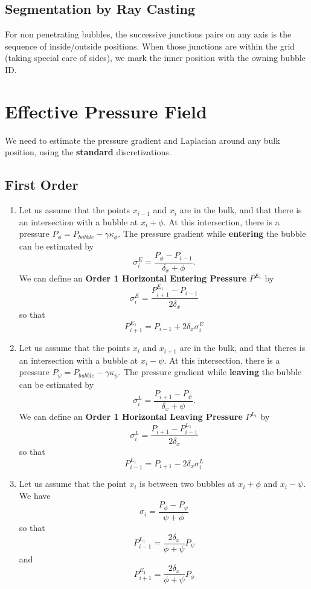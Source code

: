 \documentclass[aps]{revtex4}
\begin{document}
\subsection{Segmentation by Ray Casting}
For non penetrating bubbles, the successive junctions pairs on any axis is the sequence of inside/outside positions.
When those junctions are within the grid (taking special care of sides), we mark the inner position with the owning bubble ID.

\section{Effective Pressure Field}
We need to estimate the pressure gradient and Laplacian around any bulk position,
using the \textbf{standard} discretizations.

\subsection{First Order}
\begin{enumerate}
\item
Let us assume that the points $x_{i-1}$ and $x_i$ are in the bulk, and that there is
an intersection with a bubble at $x_i+\phi$. 
At this intersection, there is a pressure $P_\phi = P_{bubble} - \gamma \kappa_\phi$.
The pressure gradient while \textbf{entering} the bubble can be estimated by
$$
	\sigma^E_i = \dfrac{P_\phi - P_{i-1}}{\delta_x+\phi}.
$$
We can define an \textbf{Order 1 Horizontal Entering Pressure} $P^{E_1}$ by
$$
	\sigma^E_i = \dfrac{P^{E_1}_{i+1}-P_{i-1}}{2\delta_x} 
$$
so that
$$
	P^{E_1}_{i+1} = P_{i-1} + 2\delta_x\sigma^E_i
$$
\item
Let us assume that  the points $x_{i}$ and $x_{i+1}$ are in the bulk, and that
theres is an intersection with a bubble at $x_i-\psi$.
At this intersection, there is a pressure $P_\psi=P_{bubble} - \gamma \kappa_\psi$.
The pressure gradient while \textbf{leaving} the bubble can be estimated by
$$
	\sigma^L_i = \dfrac{P_{i+1}-P_\psi}{\delta_x + \psi}.
$$
We can define an \textbf{Order 1 Horizontal Leaving Pressure} $P^{L_1}$ by
$$
	\sigma^L_i = \dfrac{P_{i+1}-P^{L_1}_{i-1}}{2\delta_x}
$$
so that 
$$
	P^{L_1}_{i-1} = P_{i+1} - 2\delta_x \sigma^L_i
$$
\item
Let us assume that the point $x_i$ is between two bubbles at $x_i+\phi$ and $x_i-\psi$.
We have
$$
	\sigma_i = \dfrac{P_\phi - P_\psi}{\psi+\phi}
$$
so that
$$
	P^{L_1}_{i-1} = \dfrac{2\delta_x}{\phi+\psi} P_\psi
$$
and
$$
	P^{E_1}_{i+1} = \dfrac{2\delta_x}{\phi+\psi} P_\phi
$$
\end{enumerate}
\end{document}
